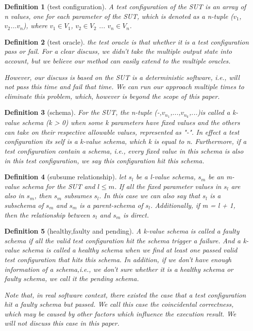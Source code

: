 \documentclass[10pt,journal,cspaper,compsoc]{IEEEtran}
\begin{document}
\newtheorem{definition}{Definition}
\begin{definition}[test configuration]
A test configuration of the SUT is an array of \emph{n} values, one for each parameter of the SUT, which is denoted as a \emph{n}-tuple ($v_{1}$, $v_{2}$...$v_{n}$), where $v_{1}\in V_{1}$, $v_{2} \in V_{2}$ ... $v_{n} \in V_{n}$.
\end{definition}
\begin{definition}[test oracle]
the test oracle is that whether it is a test configuration pass or fail. For a clear discuss, we didn't take the multiple output state into account, but we believe our method can easily extend to the multiple oracles.

However, our discuss is based on the SUT is a deterministic software, i.e., will not pass this time and fail that time. We can run our approach multiple times to eliminate this problem, which, however is beyond the scope of this paper.
\end{definition}
\begin{definition}[schema]
For the SUT, the \emph{n}-tuple (-,$v_{n_{1}}$,...,$v_{n_{k}}$,...)is called a \emph{k}-value schema (k > 0) when some k parameters have fixed values and the others can take on their respective allowable values, represented as "-". In effect a test configuration its self is a k-value schema, which k is equal to n. Furthermore, if a test configuration contain a schema, i.e., every fixed value in this schema is also in this test configuration, we say this configuration hit this schema.
\end{definition}
\begin{definition}[subsume relationship]
let $s_{l}$ be a \emph{l}-value schema, $s_{m}$ be an \emph{m}-value schema for the SUT and $l \leq m$. If all the fixed parameter values in $s_{l}$ are also in $s_{m}$, then $s_{m}$ \emph{subsumes} $s_{l}$. In this case we can also say that $s_{l}$ is a \emph{subschema} of $s_{m}$ and $s_{m}$ is a \emph{parent-schema} of $s_{l}$. Additionally, if m = l + 1, then the relationship between $s_{l}$ and $s_{m}$ is direct.
\end{definition}
\begin{definition}[healthy,faulty and pending]
A \emph{k}-value schema is called a \emph{faulty schema} if all the valid test configuration hit the schema trigger a failure. And a \emph{k}-value schema is called a \emph{healthy schema} when we find at least one passed valid test configuration that hits this schema. In addition, if we don't have enough information of a schema,i.e., we don't sure whether it is a healthy schema or faulty schema, we call it the pending schema.

Note that, in real software context, there existed the case that a test configuration hit a faulty schema but passed. We call this case the \emph{coincidental correctness}, which may be caused by other factors which influence the execution result. We will not discuss this case in this paper.
\end{definition}
\end{document}
